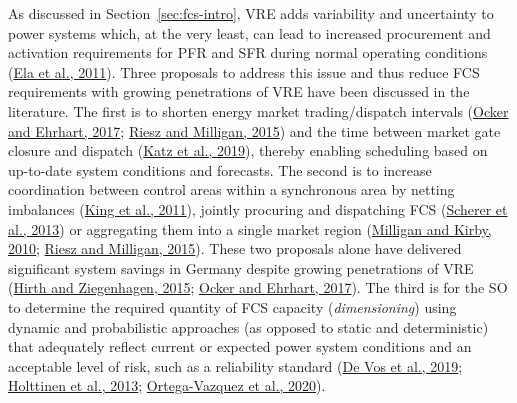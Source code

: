 \documentclass[12pt,a4paper,]{report}
\begin{document}
As discussed in Section~\ref{sec:fcs-intro}, VRE adds variability and
uncertainty to power systems which, at the very least, can lead to
increased procurement and activation requirements for PFR and SFR during
normal operating conditions
(\protect\hyperlink{ref-elaOperatingReservesVariable2011}{Ela et al.,
2011}). Three proposals to address this issue and thus reduce FCS
requirements with growing penetrations of VRE have been discussed in the
literature. The first is to shorten energy market trading/dispatch
intervals (\protect\hyperlink{ref-ockerGermanParadoxBalancing2017}{Ocker
and Ehrhart, 2017};
\protect\hyperlink{ref-rieszDesigningElectricityMarkets2015}{Riesz and
Milligan, 2015}) and the time between market gate closure and dispatch
(\protect\hyperlink{ref-katzOpeningMarketsDesigning2019}{Katz et al.,
2019}), thereby enabling scheduling based on up-to-date system
conditions and forecasts. The second is to increase coordination between
control areas within a synchronous area by netting imbalances
(\protect\hyperlink{ref-kingFlexibilityReserveReductions2011}{King et
al., 2011}), jointly procuring and dispatching FCS
(\protect\hyperlink{ref-schererIntegratedPanEuropeanAncillary2013}{Scherer
et al., 2013}) or aggregating them into a single market region
(\protect\hyperlink{ref-milliganMarketCharacteristicsEfficient2010}{Milligan
and Kirby, 2010};
\protect\hyperlink{ref-rieszDesigningElectricityMarkets2015}{Riesz and
Milligan, 2015}). These two proposals alone have delivered significant
system savings in Germany despite growing penetrations of VRE
(\protect\hyperlink{ref-hirthBalancingPowerVariable2015}{Hirth and
Ziegenhagen, 2015};
\protect\hyperlink{ref-ockerGermanParadoxBalancing2017}{Ocker and
Ehrhart, 2017}). The third is for the SO to determine the required
quantity of FCS capacity (\emph{dimensioning}) using dynamic and
probabilistic approaches (as opposed to static and deterministic) that
adequately reflect current or expected power system conditions and an
acceptable level of risk, such as a reliability standard
(\protect\hyperlink{ref-devosDynamicDimensioningApproach2019}{De Vos et
al., 2019};
\protect\hyperlink{ref-holttinenMethodologiesDetermineOperating2013}{Holttinen
et al., 2013};
\protect\hyperlink{ref-ortega-vazquezRiskBasedReserveProcurement2020}{Ortega-Vazquez
et al., 2020}).
\end{document}
